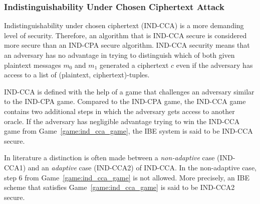 \subsubsection{Indistinguishability Under Chosen Ciphertext Attack}
Indistinguishability under chosen ciphertext (IND-CCA) is a more demanding level of security. Therefore, an algorithm that is IND-CCA secure is considered more secure than an IND-CPA secure algorithm. IND-CCA security means that an adversary has no advantage in trying to distinguish which of both given plaintext messages $m_0$ and $m_1$ generated a ciphertext $c$ even if the adversary has access to a list of (plaintext, ciphertext)-tuples.

IND-CCA is defined with the help of a game that challenges an adversary similar to the IND-CPA game. Compared to the IND-CPA game, the IND-CCA game contains two additional steps in which the adversary gets access to another oracle. If the adversary has negligible advantage trying to win the IND-CCA game from Game~\ref{game:ind_cca_game}, the IBE system is said to be IND-CCA secure.

In literature a distinction is often made between a \textit{non-adaptive} case (IND-CCA1) and an \textit{adaptive} case (IND-CCA2) of IND-CCA. In the non-adaptive case, step 6 from Game~\ref{game:ind_cca_game} is not allowed. More precisely, an IBE scheme that satisfies Game~\ref{game:ind_cca_game} is said to be IND-CCA2 secure.

